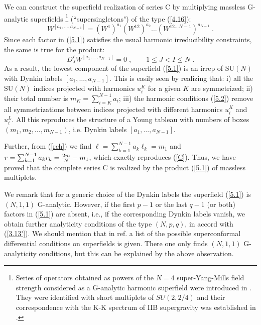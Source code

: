 \documentclass[a4paper,12pt]{article}
\begin{document}
We can construct the superfield realization of series C by 
multiplying massless G-analytic superfields \footnote{Series of 
operators obtained as powers of the $N=4$ super-Yang-Mills field 
strength considered as a G-analytic harmonic superfield were 
introduced in \cite{HWest}. They were identified with short 
multiplets of $SU(2,2/4)$ and their correspondence with the K-K 
spectrum of IIB supergravity was established in \cite{AF}.} 
(``supersingletons") of the type (\ref{4.16}): 
\begin{equation}\label{5.1}
 W^{[a_1,\ldots,a_{N-1}]} = (W^1)^{a_1}(W^{12})^{a_2}\ldots 
(W^{12\ldots N-1})^{a_{N-1}}\;.
\end{equation}
Since each factor in (\ref{5.1}) satisfies the usual harmonic 
irreducibility constraints, the same is true for the product: 
\begin{equation}\label{5.2}
  D^I_J W^{[a_1,\ldots,a_{N-1}]} = 0\;, \qquad 1\leq J < I \leq 
N\;.
\end{equation}
As a result, the lowest component of the superfield (\ref{5.1}) is 
an irrep of $\mbox{SU}(N)$ with Dynkin labels 
$[a_1,\ldots,a_{N-1}]$. This is easily seen by realizing that: i) 
all the $\mbox{SU}(N)$ indices projected with harmonics $u^K_i$ 
for a given $K$ are symmetrized; ii) their total number is 
$m_K=\sum^{N-1}_{i=K}a_i$; iii) the harmonic conditions 
(\ref{5.2}) remove all symmetrizations between indices projected 
with different harmonics $u^K_i$ and $u^L_i$. All this reproduces 
the structure of a Young tableau with numbers of boxes 
$(m_1,m_2,\ldots,m_{N-1})$, i.e. Dynkin labels 
$[a_1,\ldots,a_{N-1}]$. 

Further, from (\ref{rch}) we find $\ell= \sum^{N-1}_{k=1} 
a_k\ell_k = m_1$ and $r=\sum^{N-1}_{k=1} a_k r_k = {2m\over 
N}-m_1$, which exactly reproduces (\ref{C}). Thus, we have proved 
that the complete series C is realized by the product (\ref{5.1}) 
of massless multiplets. 

We remark that for a generic choice of the Dynkin labels the 
superfield (\ref{5.1}) is $(N,1,1)$ G-analytic. However, if the 
first $p-1$ or the last $q-1$ (or both) factors in (\ref{5.1}) are 
absent, i.e., if the corresponding Dynkin labels vanish, we obtain 
further analyticity conditions of the type $(N,p,q)$, in accord 
with (\ref{3.13'}). We should mention that in ref. \cite{dp} a 
list of the possible superconformal differential conditions on 
superfields is given. There one only finds $(N,1,1)$ G-analyticity 
conditions, but this can be explained by the above observation.   
\end{document}
